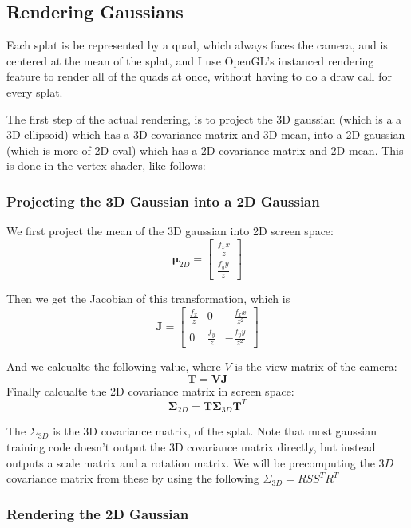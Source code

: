 \documentclass {article}
\begin{document}
     \subsection{Rendering Gaussians}

     Each splat is be represented by a quad, which always faces the camera, and is centered at the mean of the splat, and I use OpenGL's instanced rendering feature to render all of the quads at once, without having to do a draw call for every splat.

     The first step of the actual rendering, is to project the 3D gaussian (which is a a 3D ellipsoid) which has a 3D covariance matrix and 3D mean, into a 2D gaussian (which is more of 2D oval) which has a 2D covariance matrix and 2D mean. This is done in the vertex shader, like follows:

     \subsubsection{Projecting the 3D Gaussian into a 2D Gaussian}

     We first project the mean of the 3D gaussian into 2D screen space:
     $$\mathbf{\mu}_{2D} = \begin{bmatrix} 
          \frac{f_x x}{z} \\
          \frac{f_y y}{z}
          \end{bmatrix}$$

     Then we get the Jacobian of this transformation, which is 
     $$
     \mathbf{J} = \begin{bmatrix}
          \frac{f_x}{z} & 0 & -\frac{f_x x}{z^2} \\
          0 & \frac{f_y}{z} & -\frac{f_y y}{z^2}
          \end{bmatrix}
     $$

     And we calcualte the following value, where $V$ is the view matrix of the camera:
     $$\mathbf{T} = \mathbf{V}\mathbf{J}$$
     Finally calcualte the 2D covariance matrix in screen space:
     $$ \boldsymbol{\Sigma}_{2D} = \mathbf{T}\boldsymbol{\Sigma}_{3D}\mathbf{T}^T$$ 
     
     The $\Sigma_{3D}$ is the 3D covariance matrix, of the splat. Note that most gaussian training code doesn't output the 3D covariance matrix directly, but instead outputs a scale matrix and a rotation matrix. We will be precomputing the $3D$ covariance matrix from these by using the following $\Sigma_{3D} = RSS^TR^T$

     \subsubsection{Rendering the 2D Gaussian}
\end{document}
